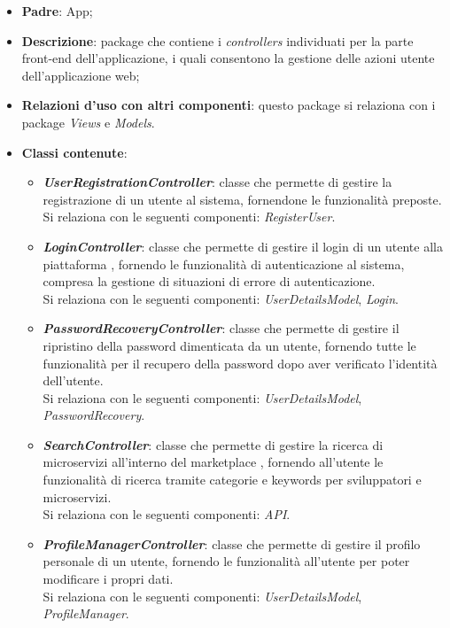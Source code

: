 \begin{itemize}
	\item \textbf{Padre}: App;
	
	\item \textbf{Descrizione}: package che contiene i \textit{controllers} individuati per la parte front-end
	dell'applicazione, i quali consentono la gestione delle azioni utente dell'applicazione web;
	
	\item \textbf{Relazioni d’uso con altri componenti}: questo package si relaziona con i package \textit{Views} e \textit{Models}.
	
	\item \textbf{Classi contenute}:
	\begin{itemize}
		
		\item \textbf{\textit{UserRegistrationController}}: classe che permette di gestire la registrazione di un utente al sistema, fornendone le funzionalità preposte.\\
		Si relaziona con le seguenti componenti: \textit{RegisterUser}.
		
		\item \textbf{\textit{LoginController}}: classe che permette di gestire il login di un utente alla piattaforma \progetto, fornendo le funzionalità di autenticazione al sistema, compresa la gestione di	situazioni di errore di autenticazione.\\
		Si relaziona con le seguenti componenti: \textit{UserDetailsModel}, \textit{Login}.
		
		\item \textbf{\textit{PasswordRecoveryController}}: classe che permette di gestire il ripristino della password dimenticata da un utente, fornendo tutte le funzionalità per il recupero della password dopo aver verificato l'identità dell'utente.\\
		Si relaziona con le seguenti componenti: \textit{UserDetailsModel}, \textit{PasswordRecovery}.
		
		\item \textbf{\textit{SearchController}}: classe che permette di gestire la ricerca di microservizi all'interno del marketplace \progetto, fornendo all'utente le funzionalità di ricerca tramite categorie e keywords per sviluppatori e microservizi.\\
		Si relaziona con le seguenti componenti: \textit{API}.
		
		\item \textbf{\textit{ProfileManagerController}}: classe che permette di gestire il profilo personale di un utente, fornendo le funzionalità all'utente per poter modificare i propri dati.\\
		Si relaziona con le seguenti componenti: \textit{UserDetailsModel}, \textit{ProfileManager}.
		

\end{itemize}
\end{itemize}
